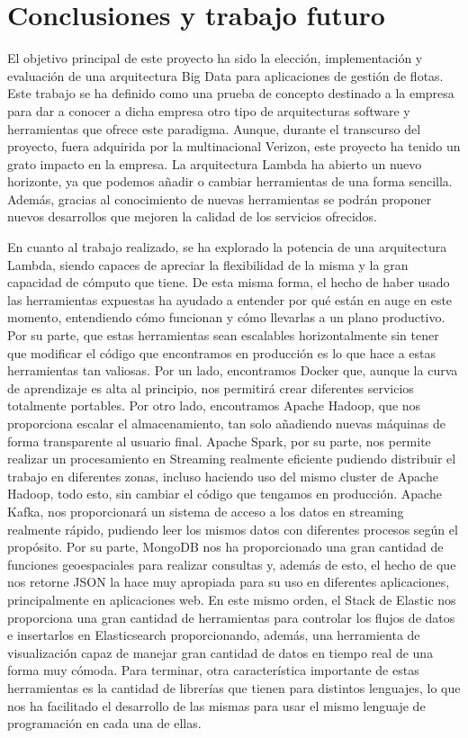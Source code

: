 \chapter{Conclusiones y trabajo futuro}

El objetivo principal de este proyecto ha sido la elección, implementación y evaluación de una arquitectura Big Data para aplicaciones de gestión de flotas. Este trabajo se ha definido como una prueba de concepto destinado a la empresa \mdata{} para dar a conocer a dicha empresa otro tipo de arquitecturas software y herramientas que ofrece este paradigma. Aunque, durante el transcurso del proyecto, \mdata{} fuera adquirida por la multinacional Verizon, este proyecto ha tenido un grato impacto en la empresa. La arquitectura Lambda ha abierto un nuevo horizonte, ya que podemos añadir o cambiar herramientas de una forma sencilla. Además, gracias al conocimiento de nuevas herramientas se podrán proponer nuevos desarrollos que mejoren la calidad de los servicios ofrecidos.

En cuanto al trabajo realizado, se ha explorado la potencia de una arquitectura Lambda, siendo capaces de apreciar la flexibilidad de la misma y la gran capacidad de cómputo que tiene. De esta misma forma, el hecho de haber usado las herramientas expuestas ha ayudado a entender por qué están en auge en este momento, entendiendo cómo funcionan y cómo llevarlas a un plano productivo. Por su parte, que estas herramientas sean escalables horizontalmente sin tener que modificar el código que encontramos en producción es lo que hace a estas herramientas tan valiosas. Por un lado, encontramos Docker que, aunque la curva de aprendizaje es alta al principio, nos permitirá crear diferentes servicios totalmente portables. Por otro lado, encontramos Apache Hadoop, que nos proporciona escalar el almacenamiento, tan solo añadiendo nuevas máquinas de forma transparente al usuario final. Apache Spark, por su parte, nos permite realizar un procesamiento en Streaming realmente eficiente pudiendo distribuir el trabajo en diferentes zonas, incluso haciendo uso del mismo cluster de Apache Hadoop, todo esto, sin cambiar el código que tengamos en producción. Apache Kafka, nos proporcionará un sistema de acceso a los datos en streaming realmente rápido, pudiendo leer los mismos datos con diferentes procesos según el propósito. Por su parte, MongoDB nos ha proporcionado una gran cantidad de funciones geoespaciales para realizar consultas y, además de esto, el hecho de que nos retorne JSON la hace muy apropiada para su uso en diferentes aplicaciones, principalmente en aplicaciones web. En este mismo orden, el Stack de Elastic nos proporciona una gran cantidad de herramientas para controlar los flujos de datos e insertarlos en Elasticsearch proporcionando, además, una herramienta de visualización capaz de manejar gran cantidad de datos en tiempo real de una forma muy cómoda. Para terminar, otra característica importante de estas herramientas es la cantidad de librerías que tienen para distintos lenguajes, lo que nos ha facilitado el desarrollo de las mismas para usar el mismo lenguaje de programación en cada una de ellas.

